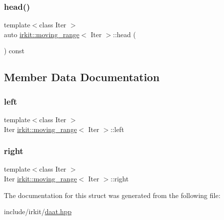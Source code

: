 \mbox{\label{structirkit_1_1moving__range_a4e4c1a83cb13e1ca572275b2c7885aeb}} 
\subsubsection{\texorpdfstring{head()}{head()}}
{\footnotesize\ttfamily template$<$class Iter $>$ \\
auto \hyperlink{structirkit_1_1moving__range}{irkit\+::moving\+\_\+range}$<$ Iter $>$\+::head (\begin{DoxyParamCaption}{ }\end{DoxyParamCaption}) const\hspace{0.3cm}{\ttfamily [inline]}}



\subsection{Member Data Documentation}
\mbox{\label{structirkit_1_1moving__range_a175a0bc6996715ea27e6b87abff03139}} 
\subsubsection{\texorpdfstring{left}{left}}
{\footnotesize\ttfamily template$<$class Iter $>$ \\
Iter \hyperlink{structirkit_1_1moving__range}{irkit\+::moving\+\_\+range}$<$ Iter $>$\+::left}

\mbox{\label{structirkit_1_1moving__range_aa64b16b98bdd7b627ecceb82c8ef3bec}} 
\subsubsection{\texorpdfstring{right}{right}}
{\footnotesize\ttfamily template$<$class Iter $>$ \\
Iter \hyperlink{structirkit_1_1moving__range}{irkit\+::moving\+\_\+range}$<$ Iter $>$\+::right}



The documentation for this struct was generated from the following file\+:\begin{DoxyCompactItemize}
\item 
include/irkit/\hyperlink{daat_8hpp}{daat.\+hpp}\end{DoxyCompactItemize}
